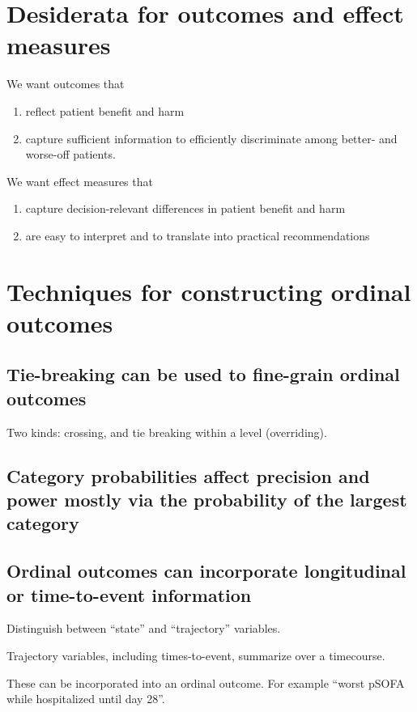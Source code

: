 \documentclass[
  11pt,
  fleqn
]{article}
\begin{document}
\section{Desiderata for outcomes and effect measures}

We want outcomes that
\begin{enumerate}
  \item reflect patient benefit and harm
  \item capture sufficient information to efficiently discriminate
    among better- and
    worse-off patients.
\end{enumerate}

We want effect measures that
\begin{enumerate}
  \item capture decision-relevant differences in patient benefit and harm
  \item are easy to interpret and to translate into practical recommendations
\end{enumerate}

\section{Techniques for constructing ordinal outcomes}

\subsection{Tie-breaking can be used to fine-grain ordinal outcomes}

Two kinds: crossing, and tie breaking within a level (overriding).

\subsection{Category probabilities affect precision and power mostly via the
probability of the largest category}

\subsection{Ordinal outcomes can incorporate longitudinal or
time-to-event information}

Distinguish between ``state'' and ``trajectory'' variables.

Trajectory variables, including times-to-event, summarize over a timecourse.

These can be incorporated into an ordinal outcome. For example ``worst pSOFA
while hospitalized until day 28''.
\end{document}

